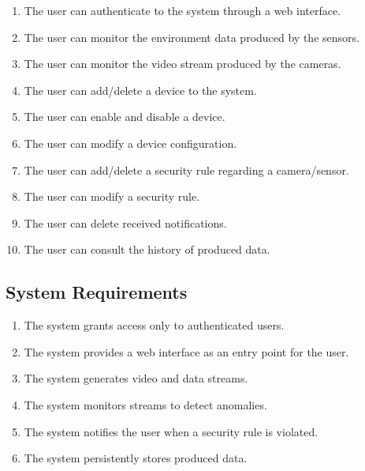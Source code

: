 \documentclass{scrartcl}
\begin{document}
    \begin{enumerate}
        \item \label{itm:user-1} The user can authenticate to the system through a web interface.
        \item \label{itm:user-2} The user can monitor the environment data produced by the sensors.
        \item \label{itm:user-3} The user can monitor the video stream produced by the cameras.
        \item \label{itm:user-4} The user can add/delete a device to the system.
        \item \label{itm:user-5} The user can enable and disable a device.
        \item \label{itm:user-6} The user can modify a device configuration.
        \item \label{itm:user-7} The user can add/delete a security rule regarding a camera/sensor.
        \item \label{itm:user-8} The user can modify a security rule.
        \item \label{itm:user-9} The user can delete received notifications.
        \item \label{itm:user-10} The user can consult the history of produced data.
    \end{enumerate}

    \subsection{System Requirements}\label{subsec:system-requirements}
    \begin{enumerate}
        \item \label{itm:sys-1} The system grants access only to authenticated users.
        \item \label{itm:sys-2} The system provides a web interface as an entry point for the user.
        \item \label{itm:sys-3} The system generates video and data streams.
        \item \label{itm:sys-4} The system monitors streams to detect anomalies.
        \item \label{itm:sys-5} The system notifies the user when a security rule is violated.
        \item \label{itm:sys-6} The system persistently stores produced data.
    \end{enumerate}
\end{document}
